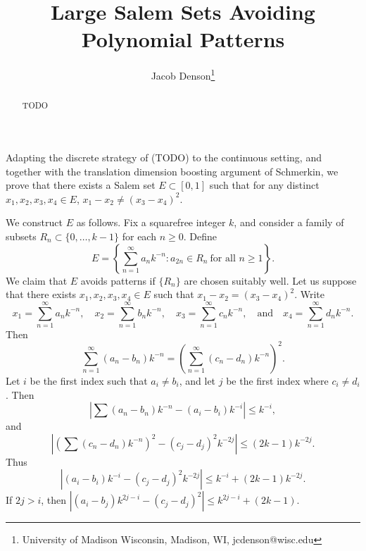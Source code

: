 \documentclass[dvipsnames,letterpaper,12pt]{article}
\title{Large Salem Sets Avoiding Polynomial Patterns}
\author{Jacob Denson\footnote{University of Madison Wisconsin, Madison, WI, jcdenson@wisc.edu}}
\numberwithin{equation}{section}
\numberwithin{theorem}{section}
\begin{document}
\maketitle

\begin{abstract}
    TODO
\end{abstract}

Adapting the discrete strategy of (TODO) to the continuous setting, and together with the translation dimension boosting argument of Schmerkin, we prove that there exists a Salem set $E \subset [0,1]$ such that for any distinct $x_1,x_2,x_3,x_4 \in E$, $x_1 - x_2 \neq (x_3 - x_4)^2$.

We construct $E$ as follows. Fix a squarefree integer $k$, and consider a family of subsets $R_n \subset \{ 0, \dots, k-1 \}$ for each $n \geq 0$. Define
%
\[ E = \left\{ \sum_{n = 1}^\infty a_n k^{-n} : a_{2n} \in R_n\ \text{for all $n \geq 1$} \right\}. \]
%
We claim that $E$ avoids patterns if $\{ R_n \}$ are chosen suitably well. Let us suppose that there exists $x_1,x_2,x_3,x_4 \in E$ such that $x_1 - x_2 = (x_3 - x_4)^2$. Write
%
\[ x_1 = \sum_{n = 1}^\infty a_n k^{-n}, \quad x_2 = \sum_{n = 1}^\infty b_n k^{-n}, \quad x_3 = \sum_{n = 1}^\infty c_n k^{-n},\quad\text{and}\quad x_4 = \sum_{n = 1}^\infty d_n k^{-n}. \]
%
Then
%
\[ \sum_{n = 1}^\infty (a_n - b_n) k^{-n} = \left( \sum_{n = 1}^\infty (c_n - d_n) k^{-n} \right)^2. \]
%
Let $i$ be the first index such that $a_i \neq b_i$, and let $j$ be the first index where $c_i \neq d_i$. Then
%
\[ \left| \sum (a_n - b_n) k^{-n} - (a_i - b_i) k^{-i} \right| \leq k^{-i}, \]
%
and
%
\[ \left| \left( \sum (c_n - d_n) k^{-n} \right)^2 - (c_j - d_j)^2 k^{-2j} \right| \leq (2k-1) k^{-2j}. \]
%
Thus
%
\[ |(a_i - b_i) k^{-i} - (c_j - d_j)^2 k^{-2j}| \leq k^{-i} + (2k-1) k^{-2j}. \]
%
If $2j > i$, then $|(a_i - b_j) k^{2j-i} - (c_j - d_j)^2| \leq k^{2j-i} + (2k-1)$.
\end{document}

